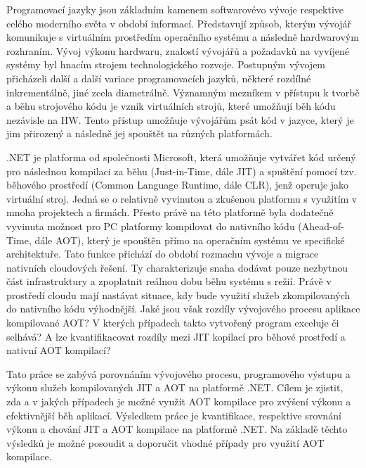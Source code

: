 Programovací jazyky jsou základním kamenem softwarovévo vývoje respektive celého moderního světa v období informací. Představují způsob, kterým vývojář komunikuje s virtuálním prostředím operačního systému a následně hardwarovým rozhraním. Vývoj výkonu hardwaru, znalostí vývojářů a požadavků na vyvíjené systémy byl hnacím strojem technologického rozvoje. Postupným vývojem přicházeli další a další variace programovacích jazyků, některé rozdílné inkrementálně, jiné zcela diametrálně. Významným mezníkem v přístupu k tvorbě a běhu strojového kódu je vznik virtuálních strojů, které umožňují běh kódu nezávisle na HW. Tento přístup umožňuje vývojářům psát kód v jazyce, který je jim přirozený a následně jej spouštět na různých platformách.

.NET je platforma od společnosti Microsoft, která umožňuje vytvářet kód určený pro následnou kompilaci za běhu (Just-in-Time, dále JIT) a spuštění pomocí tzv. běhového prostředí (Common Language Runtime, dále CLR), jenž operuje jako virtuální stroj. Jedná se o relativně vyvinutou a zkušenou platformu s využitím v mnoha projektech a firmách. Přesto právě na této platformě byla dodatečně vyvinuta možnost pro PC platformy kompilovat do nativního kódu (Ahead-of-Time, dále AOT), který je spouštěn přímo na operačním systému ve specifické architektuře. Tato funkce přichází do období rozmachu vývoje a migrace nativních cloudových řešení. Ty charakterizuje snaha dodávat pouze nezbytnou část infrastruktury a zpoplatnit reálnou dobu běhu systému s režií. Právě v prostředí cloudu mají nastávat situace, kdy bude využití služeb zkompilovaných do nativního kódu výhodnější. Jaké jsou však rozdíly vývojového procesu aplikace kompilované AOT? V kterých případech takto vytvořený program exceluje či selhává? A lze kvantifikacovat rozdíly mezi JIT kopilací pro běhové prostředí a nativní AOT kompilací?

Tato práce se zabývá porovnáním vývojového procesu, programového výstupu a výkonu služeb kompilovaných JIT a AOT na platformě .NET. Cílem je zjistit, zda a v jakých případech je možné využít AOT kompilace pro zvýšení výkonu a efektivnější běh aplikací. Výsledkem práce je kvantifikace, respektive srovnání výkonu a chování JIT a AOT kompilace na platformě .NET. Na základě těchto výsledků je možné posoudit a doporučit vhodné případy pro využití AOT kompilace.